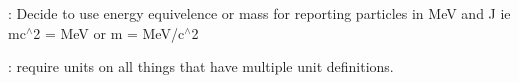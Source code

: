 
\begin{DoxyRefList}
\item[\label{todo__todo000001}%
\Hypertarget{todo__todo000001}%
Module \hyperlink{group___n_i_s_t_const}{N\+I\+S\+T\+Const} ]\+: Decide to use energy equivelence or mass for reporting particles in MeV and J ie mc$^\wedge$2 = MeV or m = Me\+V/c$^\wedge$2 

\+: require units on all things that have multiple unit definitions. 
\end{DoxyRefList}